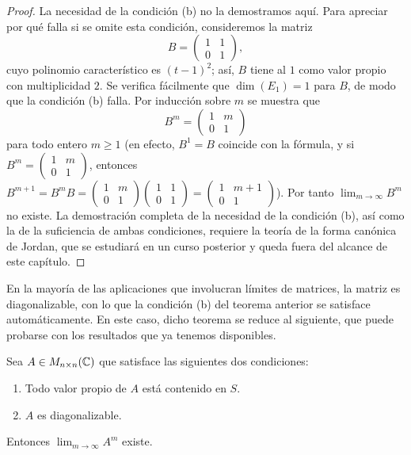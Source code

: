 \documentclass[12pt,a4paper]{book}
\begin{document}
\begin{proof}
        La necesidad de la condición (b) no la demostramos aquí. Para apreciar por qué falla si se omite esta condición, consideremos la matriz
        \begin{equation*}
            B=\begin{pmatrix}1&1\\0&1\end{pmatrix},
        \end{equation*}
        cuyo polinomio característico es $(t-1)^2$; así, $B$ tiene al $1$ como valor propio con multiplicidad $2$. Se verifica fácilmente que $\dim(E_1)=1$ para $B$, de modo que la condición (b) falla. Por inducción sobre $m$ se muestra que
        \begin{equation*}
            B^m=\begin{pmatrix}1&m\\0&1\end{pmatrix}
        \end{equation*}
        para todo entero $m\geq 1$ (en efecto, $B^1=B$ coincide con la fórmula, y si $B^m=\left(\begin{smallmatrix}1&m\\0&1\end{smallmatrix}\right)$, entonces $B^{m+1}=B^mB=\left(\begin{smallmatrix}1&m\\0&1\end{smallmatrix}\right)\left(\begin{smallmatrix}1&1\\0&1\end{smallmatrix}\right)=\left(\begin{smallmatrix}1&m+1\\0&1\end{smallmatrix}\right)$). Por tanto $\lim_{m\to\infty}B^m$ no existe. La demostración completa de la necesidad de la condición (b), así como la de la suficiencia de ambas condiciones, requiere la teoría de la forma canónica de Jordan, que se estudiará en un curso posterior y queda fuera del alcance de este capítulo.
    \end{proof}

    En la mayoría de las aplicaciones que involucran límites de matrices, la matriz es diagonalizable, con lo que la condición (b) del teorema anterior se satisface automáticamente. En este caso, dicho teorema se reduce al siguiente, que puede probarse con los resultados que ya tenemos disponibles.

    \begin{teorema}
        Sea $A\in M_{n\times n}(\mathbb{C})$ que satisface las siguientes dos condiciones:
        \begin{enumerate}[label=(\roman*)]
            \item Todo valor propio de $A$ está contenido en $S$.
            \item $A$ es diagonalizable.
        \end{enumerate}
        Entonces $\lim_{m\to\infty}A^m$ existe.
    \end{teorema}
\end{document}
